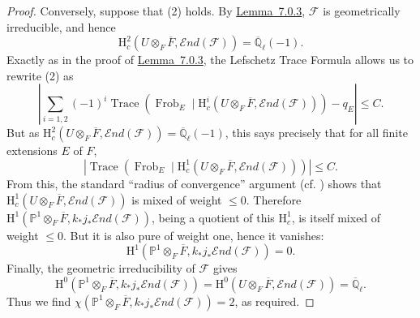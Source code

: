 \begin{proof}
Conversely, suppose that (2) holds. By \hyperref[lem:7.0.3]{Lemma~7.0.3}, \(\mathcal{F}\) is geometrically irreducible, and hence
\[
\mathrm{H}^2_c(U\otimes_F\overline{F},\mathcal{E}nd(\mathcal{F}))=\overline{\mathbb{Q}}_\ell(-1).
\]
Exactly as in the proof of \hyperref[lem:7.0.3]{Lemma~7.0.3}, the Lefschetz Trace Formula allows us to rewrite (2) as
\[
\left|\sum_{i=1,2}(-1)^i\operatorname{Trace}(\operatorname{Frob}_E\mid\mathrm{H}^i_c(U\otimes_F\overline{F},\mathcal{E}nd(\mathcal{F})))-q_E\right|\leq C.
\]
But as \(\mathrm{H}^2_c(U\otimes_F\overline{F},\mathcal{E}nd(\mathcal{F}))=\overline{\mathbb{Q}}_\ell(-1)\), this says precisely that for all finite extensions \(E\) of \(F\),
\[
\left|\operatorname{Trace}(\operatorname{Frob}_E\mid\mathrm{H}^1_c(U\otimes_F\overline{F},\mathcal{E}nd(\mathcal{F})))\right|\leq C.
\]
From this, the standard ``radius of convergence'' argument (cf. \cite[2.2.1.1]{Ka-SE}) shows that \(\mathrm{H}^1_c(U\otimes_F\overline{F},\mathcal{E}nd(\mathcal{F}))\) is mixed of weight \(\leq0\). Therefore \(\mathrm{H}^1(\mathbb{P}^1\otimes_F\overline{F},k_*j_*\mathcal{E}nd(\mathcal{F}))\), being a quotient of this \(\mathrm{H}^1_c\), is itself mixed of weight \(\leq0\). But it is also pure of weight one, hence it vanishes:
\[
\mathrm{H}^1(\mathbb{P}^1\otimes_F\overline{F},k_*j_*\mathcal{E}nd(\mathcal{F}))=0.
\]
Finally, the geometric irreducibility of \(\mathcal{F}\) gives
\[
\mathrm{H}^0(\mathbb{P}^1\otimes_F\overline{F},k_*j_*\mathcal{E}nd(\mathcal{F}))
=\mathrm{H}^0(U\otimes_F\overline{F},\mathcal{E}nd(\mathcal{F}))=\overline{\mathbb{Q}}_\ell.
\]
Thus we find \(\chi(\mathbb{P}^1\otimes_F\overline{F},k_*j_*\mathcal{E}nd(\mathcal{F}))=2\), as required.
\end{proof}

